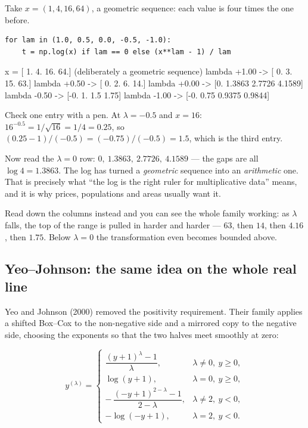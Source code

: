 \documentclass[11pt]{article}
\begin{document}
\begin{worked}
Take $x = (1, 4, 16, 64)$, a geometric sequence: each value is four times the
one before.

\begin{lstlisting}
for lam in (1.0, 0.5, 0.0, -0.5, -1.0):
    t = np.log(x) if lam == 0 else (x**lam - 1) / lam
\end{lstlisting}
\begin{codeout}
x = [ 1.  4. 16. 64.]   (deliberately a geometric sequence)
  lambda +1.00  ->  [ 0.  3. 15. 63.]
  lambda +0.50  ->  [ 0.  2.  6. 14.]
  lambda +0.00  ->  [0.     1.3863 2.7726 4.1589]
  lambda -0.50  ->  [-0.    1.    1.5   1.75]
  lambda -1.00  ->  [-0.      0.75    0.9375  0.9844]
\end{codeout}

Check one entry with a pen. At $\lambda = -0.5$ and $x = 16$:
$16^{-0.5} = 1/\sqrt{16} = 1/4 = 0.25$, so
$(0.25 - 1)/(-0.5) = (-0.75)/(-0.5) = 1.5$, which is the third entry.

Now read the $\lambda = 0$ row: $0,\ 1.3863,\ 2.7726,\ 4.1589$ --- the gaps are
all $\log 4 = 1.3863$. The log has turned a \emph{geometric} sequence into an
\emph{arithmetic} one. That is precisely what ``the log is the right ruler for
multiplicative data'' means, and it is why prices, populations and areas
usually want it.

Read down the columns instead and you can see the whole family working: as
$\lambda$ falls, the top of the range is pulled in harder and harder --- $63$,
then $14$, then $4.16$, then $1.75$. Below $\lambda = 0$ the transformation
even becomes bounded above.
\end{worked}

\subsection{Yeo--Johnson: the same idea on the whole real line}
\label{sec:yj}

Yeo and Johnson (2000) removed the positivity requirement. Their family applies
a shifted Box--Cox to the non-negative side and a mirrored copy to the negative
side, choosing the exponents so that the two halves meet smoothly at zero:

\begin{equation}
  \label{eq:yj}
  y^{(\lambda)} =
  \begin{cases}
    \dfrac{(y+1)^{\lambda} - 1}{\lambda}, & \lambda \neq 0,\ y \ge 0,\\[9pt]
    \log(y+1), & \lambda = 0,\ y \ge 0,\\[9pt]
    -\,\dfrac{(-y+1)^{2-\lambda} - 1}{2-\lambda}, & \lambda \neq 2,\ y < 0,\\[9pt]
    -\log(-y+1), & \lambda = 2,\ y < 0 .
  \end{cases}
\end{equation}
\end{document}
